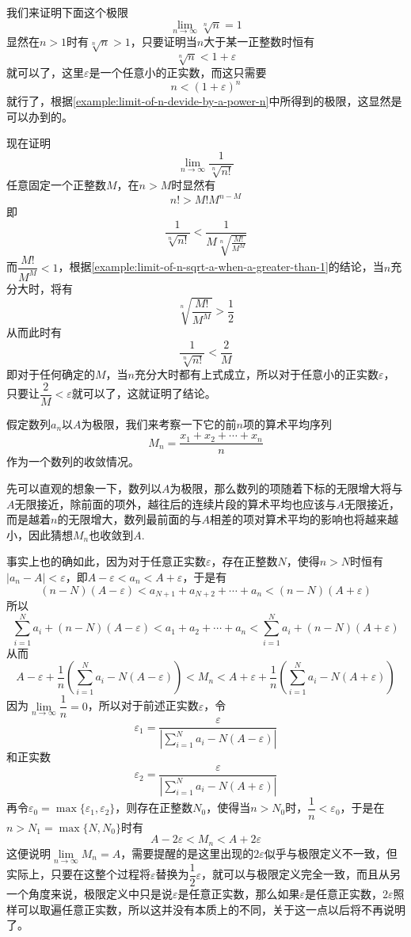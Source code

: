 \begin{example}
  我们来证明下面这个极限
  \[ \lim_{n \to \infty} \sqrt[n]{n} = 1 \]
  显然在$n>1$时有$\sqrt[n]{n}>1$，只要证明当$n$大于某一正整数时恒有
  \[ \sqrt[n]{n}<1+\varepsilon \]
  就可以了，这里$\varepsilon$是一个任意小的正实数，而这只需要
  \[ n < (1+\varepsilon)^n \]
  就行了，根据\autoref{example:limit-of-n-devide-by-a-power-n}中所得到的极限，这显然是可以办到的。
\end{example}

\begin{example}
  现在证明
  \[ \lim_{n \to \infty} \frac{1}{\sqrt[n]{n!}} \]
  任意固定一个正整数$M$，在$n>M$时显然有
  \[ n!>M!M^{n-M} \]
  即
  \[ \frac{1}{\sqrt[n]{n!}} < \frac{1}{M \sqrt[n]{\frac{M!}{M^M}}} \]
  而$\dfrac{M!}{M^M}<1$，根据\autoref{example:limit-of-n-sqrt-a-when-a-greater-than-1}的结论，当$n$充分大时，将有
  \[ \sqrt[n]{\frac{M!}{M^M}} > \frac{1}{2} \]
  从而此时有
  \[ \frac{1}{\sqrt[n]{n!}} < \frac{2}{M} \]
  即对于任何确定的$M$，当$n$充分大时都有上式成立，所以对于任意小的正实数$\varepsilon$，只要让$\dfrac{2}{M}<\varepsilon$就可以了，这就证明了结论。
\end{example}

\begin{example}
  \label{example:mean-value-of-converge-number-sequence}
  假定数列$a_n$以$A$为极限，我们来考察一下它的前$n$项的算术平均序列
  \[ M_n=\frac{x_1+x_2+\cdots+x_n}{n} \]
  作为一个数列的收敛情况。

  先可以直观的想象一下，数列以$A$为极限，那么数列的项随着下标的无限增大将与$A$无限接近，除前面的项外，越往后的连续片段的算术平均也应该与$A$无限接近，而是越着$n$的无限增大，数列最前面的与$A$相差的项对算术平均的影响也将越来越小，因此猜想$M_n$也收敛到$A$.

  事实上也的确如此，因为对于任意正实数$\varepsilon$，存在正整数$N$，使得$n>N$时恒有$|a_n-A|<\varepsilon$，即$A-\varepsilon<a_n<A+\varepsilon$，于是有
  \[ (n-N)(A-\varepsilon) < a_{N+1}+a_{N+2}+\cdots+a_n < (n-N)(A+\varepsilon) \]
  所以
  \[ \sum_{i=1}^Na_i + (n-N)(A-\varepsilon) < a_{1}+a_{2}+\cdots+a_n < \sum_{i=1}^Na_i + (n-N)(A+\varepsilon) \]
  从而
  \[ A-\varepsilon + \frac{1}{n} \left( \sum_{i=1}^Na_i - N(A-\varepsilon) \right) < M_n <  A+\varepsilon + \frac{1}{n} \left( \sum_{i=1}^Na_i - N(A+\varepsilon) \right)\]
  因为$\lim\limits_{n \to \infty}\dfrac{1}{n} = 0$，所以对于前述正实数$\varepsilon$，令
  \[ \varepsilon_1= \frac{\varepsilon}{\left| \sum_{i=1}^Na_i - N(A-\varepsilon) \right|} \]
  和正实数
  \[ \varepsilon_2= \frac{\varepsilon}{\left| \sum_{i=1}^Na_i - N(A+\varepsilon) \right|} \]
  再令$\varepsilon_0=\max\{\varepsilon_1,\varepsilon_2\}$，则存在正整数$N_0$，使得当$n>N_0$时，$\dfrac{1}{n}<\varepsilon_0$，于是在$n>N_1=\max\{N,N_0\}$时有
  \[ A-2\varepsilon < M_n < A+2\varepsilon \]
  这便说明$\lim\limits_{n \to \infty}M_n = A$，需要提醒的是这里出现的$2\varepsilon$似乎与极限定义不一致，但实际上，只要在这整个过程将$\varepsilon$替换为$\dfrac{1}{2}\varepsilon$，就可以与极限定义完全一致，而且从另一个角度来说，极限定义中只是说$\varepsilon$是任意正实数，那么如果$\varepsilon$是任意正实数，$2\varepsilon$照样可以取遍任意正实数，所以这并没有本质上的不同，关于这一点以后将不再说明了。
\end{example}

